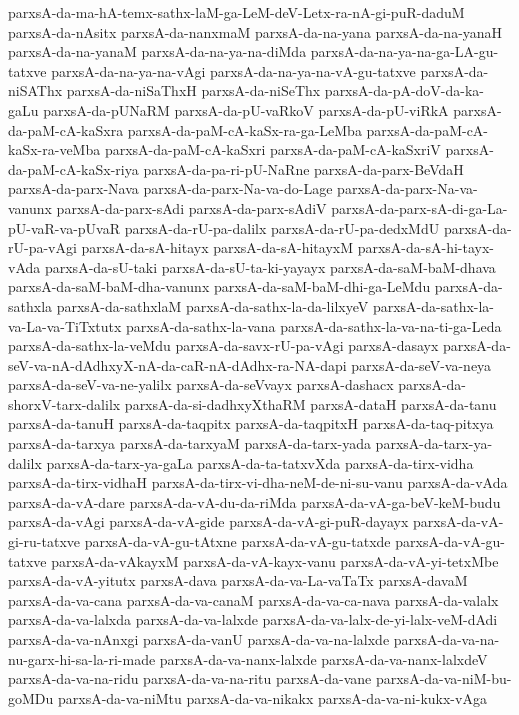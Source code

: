 {parxsA-da-ma-hA-temx-sathx-laM-ga-LeM-deV-Letx-ra-nA-gi-puR-daduM
parxsA-da-nAsitx
parxsA-da-nanxmaM
parxsA-da-na-yana
parxsA-da-na-yanaH
parxsA-da-na-yanaM
parxsA-da-na-ya-na-diMda
parxsA-da-na-ya-na-ga-LA-gu-tatxve
parxsA-da-na-ya-na-vAgi
parxsA-da-na-ya-na-vA-gu-tatxve
parxsA-da-niSAThx
parxsA-da-niSaThxH
parxsA-da-niSeThx
parxsA-da-pA-doV-da-ka-gaLu
parxsA-da-pUNaRM
parxsA-da-pU-vaRkoV
parxsA-da-pU-viRkA
parxsA-da-paM-cA-kaSxra
parxsA-da-paM-cA-kaSx-ra-ga-LeMba
parxsA-da-paM-cA-kaSx-ra-veMba
parxsA-da-paM-cA-kaSxri
parxsA-da-paM-cA-kaSxriV
parxsA-da-paM-cA-kaSx-riya
parxsA-da-pa-ri-pU-NaRne
parxsA-da-parx-BeVdaH
parxsA-da-parx-Nava
parxsA-da-parx-Na-va-do-Lage
parxsA-da-parx-Na-va-vanunx
parxsA-da-parx-sAdi
parxsA-da-parx-sAdiV
parxsA-da-parx-sA-di-ga-La-pU-vaR-va-pUvaR
parxsA-da-rU-pa-dalilx
parxsA-da-rU-pa-dedxMdU
parxsA-da-rU-pa-vAgi
parxsA-da-sA-hitayx
parxsA-da-sA-hitayxM
parxsA-da-sA-hi-tayx-vAda
parxsA-da-sU-taki
parxsA-da-sU-ta-ki-yayayx
parxsA-da-saM-baM-dhava
parxsA-da-saM-baM-dha-vanunx
parxsA-da-saM-baM-dhi-ga-LeMdu
parxsA-da-sathxla
parxsA-da-sathxlaM
parxsA-da-sathx-la-da-lilxyeV
parxsA-da-sathx-la-va-La-va-TiTxtutx
parxsA-da-sathx-la-vana
parxsA-da-sathx-la-va-na-ti-ga-Leda
parxsA-da-sathx-la-veMdu
parxsA-da-savx-rU-pa-vAgi
parxsA-dasayx
parxsA-da-seV-va-nA-dAdhxyX-nA-da-caR-nA-dAdhx-ra-NA-dapi
parxsA-da-seV-va-neya
parxsA-da-seV-va-ne-yalilx
parxsA-da-seVvayx
parxsA-dashacx
parxsA-da-shorxV-tarx-dalilx
parxsA-da-si-dadhxyXthaRM
parxsA-dataH
parxsA-da-tanu
parxsA-da-tanuH
parxsA-da-taqpitx
parxsA-da-taqpitxH
parxsA-da-taq-pitxya
parxsA-da-tarxya
parxsA-da-tarxyaM
parxsA-da-tarx-yada
parxsA-da-tarx-ya-dalilx
parxsA-da-tarx-ya-gaLa
parxsA-da-ta-tatxvXda
parxsA-da-tirx-vidha
parxsA-da-tirx-vidhaH
parxsA-da-tirx-vi-dha-neM-de-ni-su-vanu
parxsA-da-vAda
parxsA-da-vA-dare
parxsA-da-vA-du-da-riMda
parxsA-da-vA-ga-beV-keM-budu
parxsA-da-vAgi
parxsA-da-vA-gide
parxsA-da-vA-gi-puR-dayayx
parxsA-da-vA-gi-ru-tatxve
parxsA-da-vA-gu-tAtxne
parxsA-da-vA-gu-tatxde
parxsA-da-vA-gu-tatxve
parxsA-da-vAkayxM
parxsA-da-vA-kayx-vanu
parxsA-da-vA-yi-tetxMbe
parxsA-da-vA-yitutx
parxsA-dava
parxsA-da-va-La-vaTaTx
parxsA-davaM
parxsA-da-va-cana
parxsA-da-va-canaM
parxsA-da-va-ca-nava
parxsA-da-valalx
parxsA-da-va-lalxda
parxsA-da-va-lalxde
parxsA-da-va-lalx-de-yi-lalx-veM-dAdi
parxsA-da-va-nAnxgi
parxsA-da-vanU
parxsA-da-va-na-lalxde
parxsA-da-va-na-nu-garx-hi-sa-la-ri-made
parxsA-da-va-nanx-lalxde
parxsA-da-va-nanx-lalxdeV
parxsA-da-va-na-ridu
parxsA-da-va-na-ritu
parxsA-da-vane
parxsA-da-va-niM-bu-goMDu
parxsA-da-va-niMtu
parxsA-da-va-nikakx
parxsA-da-va-ni-kukx-vAga
}
